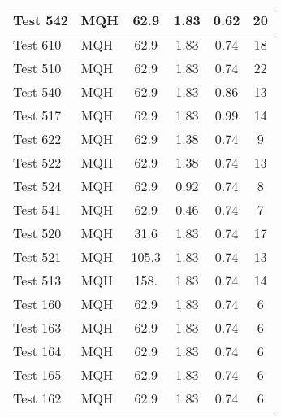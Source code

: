 \begin{table}[!ht]
\begin{center}
\begin{tabular}{|l|l|c|c|c|c|}
Test 542   &  MQH               &  62.9           &  1.83            &  0.62            &  20                   \\ \hline
Test 610   &  MQH               &  62.9           &  1.83            &  0.74            &  18                   \\ \hline
Test 510   &  MQH               &  62.9           &  1.83            &  0.74            &  22                   \\ \hline
Test 540   &  MQH               &  62.9           &  1.83            &  0.86            &  13                   \\ \hline
Test 517   &  MQH               &  62.9           &  1.83            &  0.99            &  14                   \\ \hline
Test 622   &  MQH               &  62.9           &  1.38            &  0.74            &  9                    \\ \hline
Test 522   &  MQH               &  62.9           &  1.38            &  0.74            &  13                   \\ \hline
Test 524   &  MQH               &  62.9           &  0.92            &  0.74            &  8                    \\ \hline
Test 541   &  MQH               &  62.9           &  0.46            &  0.74            &  7                    \\ \hline
Test 520   &  MQH               &  31.6           &  1.83            &  0.74            &  17                   \\ \hline
Test 521   &  MQH               &  105.3          &  1.83            &  0.74            &  13                   \\ \hline
Test 513   &  MQH               &  158.           &  1.83            &  0.74            &  14                   \\ \hline
Test 160   &  MQH               &  62.9           &  1.83            &  0.74            &  6                    \\ \hline
Test 163   &  MQH               &  62.9           &  1.83            &  0.74            &  6                    \\ \hline
Test 164   &  MQH               &  62.9           &  1.83            &  0.74            &  6                    \\ \hline
Test 165   &  MQH               &  62.9           &  1.83            &  0.74            &  6                    \\ \hline
Test 162   &  MQH               &  62.9           &  1.83            &  0.74            &  6                    \\ \hline

\end{tabular}
\end{center}
\end{table}
